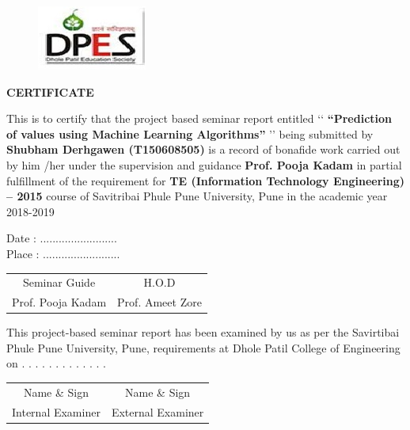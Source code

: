 \documentclass[12pt,times,a4paper]{report}
\begin{document}


\begin{titlepage}
\begin{center} 
\begin{figure}[h]

\centerline{\includegraphics[scale=0.8]{logo1}}

\end{figure}


\vspace*{0.1in}
{\fontsize{16}{12}\textbf{{CERTIFICATE}} }\\
\begin{enumerate}
\vspace{0.3in}
This is to certify that the project based seminar report entitled \lq\lq \textbf{ “Prediction of values using Machine Learning Algorithms”}
 \rq\rq
being submitted by \textbf{ Shubham Derhgawen (T150608505)}  is a record of bonafide work carried out by him
/her under the supervision and guidance\textbf{ Prof. Pooja Kadam } in partial fulfillment of the
requirement for \textbf{ TE (Information Technology Engineering) – 2015} course of Savitribai Phule
Pune University, Pune in the academic year 2018-2019

\vspace*{0.3in}
Date  : .........................  \\ 
Place : .........................  \\ 
 
\vspace{0.8in}
\begin{table} [h]
\addtolength{\tabcolsep}{65pt}
\begin{tabular}{c                c  }
Seminar Guide  & H.O.D \\
 Prof. Pooja Kadam  & Prof. Ameet Zore 
\end{tabular}
\end{table}
\vspace{0.8in}
\hrulefill

This project-based seminar report has been examined by us as per the Savirtibai Phule Pune
University, Pune, requirements at Dhole Patil College of Engineering on . . . . . . . . . . . . .
\vspace{0.6in}
\begin{table} [h]
\addtolength{\tabcolsep}{65pt}
\begin{tabular}{c                c  }
Name \& Sign  & Name \& Sign \\
 Internal Examiner   & External Examiner 
\end{tabular}
\end{table}
\end{enumerate}
\end{center}

\end{titlepage}
\end{document}
